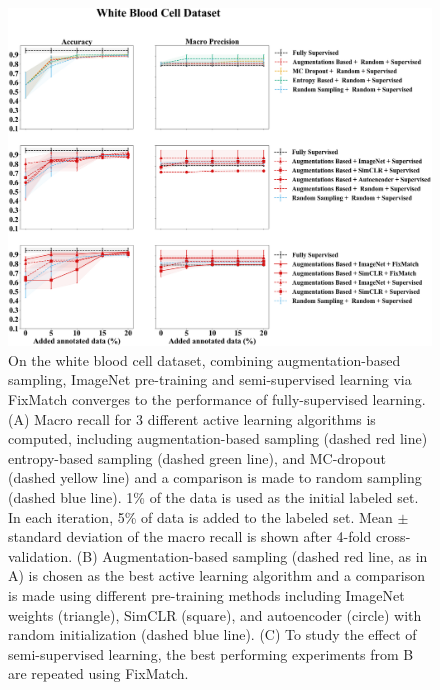 \begin{figure}[htbp]
\centering
\captionsetup{format=plain}
\includegraphics[width=\textwidth]{figures/fig_2_white_acc_precision.png}
\caption{On the white blood cell dataset, combining augmentation-based sampling, ImageNet pre-training and semi-supervised learning via FixMatch converges to the performance of fully-supervised learning. (A) Macro recall for 3 different active learning algorithms is computed, including augmentation-based sampling (dashed red line) entropy-based sampling (dashed green line), and MC-dropout (dashed yellow line) and a comparison is made to random sampling (dashed blue line). 1\% of the data is used as the initial labeled set. In each iteration, 5\% of data is added to the labeled set. Mean $\pm$ standard deviation of the macro recall is shown after 4-fold cross-validation. (B) Augmentation-based sampling (dashed red line, as in A) is chosen as the best active learning algorithm and a comparison is made using different pre-training methods including ImageNet weights (triangle), SimCLR (square), and autoencoder (circle) with random initialization (dashed blue line). (C) To study the effect of semi-supervised learning, the best performing experiments from B are repeated using FixMatch.}
\label{fig:fig_2_white_acc_precision}
\end{figure}

